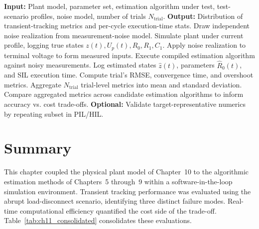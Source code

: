 \begin{algorithm}[htbp]
\caption{SIL Evaluation of an Estimation Algorithm}
\label{alg:sil_evaluation}
\begin{algorithmic}[1]
\State \textbf{Input:} Plant model, parameter set, estimation algorithm under test, test-scenario profiles, noise model, number of trials $N_{\text{trial}}$.
\State \textbf{Output:} Distribution of transient-tracking metrics and per-cycle execution-time stats.
        \State Draw independent noise realization from measurement-noise model.
        \State Simulate plant under current profile, logging true states $z(t), U_p(t), R_0, R_1, C_1$.
        \State Apply noise realization to terminal voltage to form measured inputs.
        \State Execute compiled estimation algorithm against noisy measurements.
        \State Log estimated states $\hat{z}(t)$, parameters $\hat{R}_0(t)$, and SIL execution time.
        \State Compute trial's RMSE, convergence time, and overshoot metrics.
    \EndFor
    \State Aggregate $N_{\text{trial}}$ trial-level metrics into mean and standard deviation.
\EndFor
\State Compare aggregated metrics across candidate estimation algorithms to inform accuracy vs. cost trade-offs.
\State \textbf{Optional:} Validate target-representative numerics by repeating subset in PIL/HIL.
\end{algorithmic}
\end{algorithm}

\section{Summary}
\label{sec:summary_ch11}

This chapter coupled the physical plant model of Chapter~10 to the algorithmic estimation methods of Chapters~5 through~9 within a software-in-the-loop simulation environment. Transient tracking performance was evaluated using the abrupt load-disconnect scenario, identifying three distinct failure modes. Real-time computational efficiency quantified the cost side of the trade-off. Table~\ref{tab:ch11_consolidated} consolidates these evaluations.

